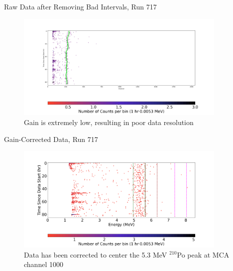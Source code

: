 \documentclass[aspectratio=169]{beamer}
\begin{document}
\begin{frame}{Raw Data after Removing Bad Intervals, Run 717}
    \begin{figure}
        \begin{center}
            \includegraphics[width=0.9\textwidth]
            {assets/717/RDP.png}
            \caption{Gain is extremely low, resulting in poor data resolution}
        \end{center}
    \end{figure}
\end{frame}

\begin{frame}{Gain-Corrected Data, Run 717}
    \begin{figure}
        \begin{center}
            \includegraphics[width=0.9\textwidth]
            {assets/717/CD.png}
            \caption{Data has been corrected to center the 5.3 MeV $^{210}$Po peak at MCA channel 1000}
        \end{center}
    \end{figure}
\end{frame}
\end{document}
